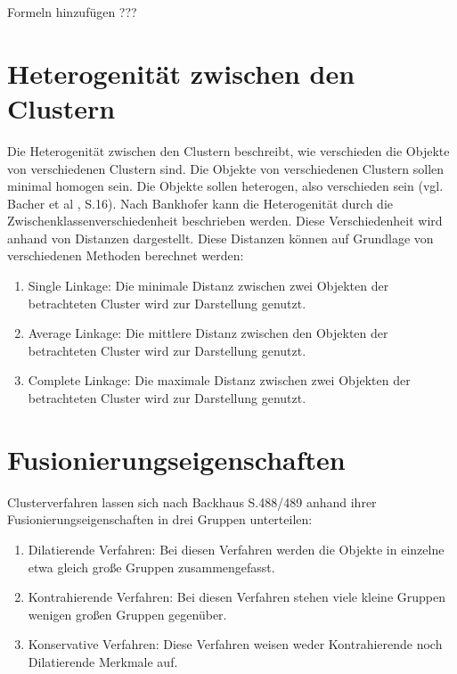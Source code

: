 Formeln hinzufügen ???
\section{Heterogenität zwischen den Clustern}
Die Heterogenität zwischen den Clustern beschreibt, wie verschieden die Objekte von verschiedenen Clustern sind. Die Objekte von verschiedenen Clustern sollen minimal homogen sein. Die Objekte sollen heterogen, also verschieden sein (vgl. Bacher et al \cite{Bacher.2010}, S.16).
Nach Bankhofer \cite{Bankhofer.2008} kann die Heterogenität durch die Zwischenklassenverschiedenheit beschrieben werden. Diese Verschiedenheit wird anhand von Distanzen dargestellt. Diese Distanzen können auf Grundlage von verschiedenen Methoden berechnet werden:
\begin{enumerate}
        \item Single Linkage: Die minimale Distanz zwischen zwei Objekten der betrachteten Cluster wird zur Darstellung genutzt.
        \item Average Linkage: Die mittlere Distanz zwischen den Objekten der betrachteten Cluster wird zur Darstellung genutzt.
        \item Complete Linkage: Die maximale Distanz zwischen zwei Objekten der betrachteten Cluster wird zur Darstellung genutzt.
\end{enumerate}

\section{Fusionierungseigenschaften}
Clusterverfahren lassen sich nach Backhaus \cite{Backhaus.2016} S.488/489 anhand ihrer Fusionierungseigenschaften in drei Gruppen unterteilen:
\begin{enumerate}
        \item Dilatierende Verfahren: Bei diesen Verfahren werden die Objekte in einzelne etwa gleich große Gruppen zusammengefasst.
        \item Kontrahierende Verfahren: Bei diesen Verfahren stehen viele kleine Gruppen wenigen großen Gruppen gegenüber.
        \item Konservative Verfahren: Diese Verfahren weisen weder Kontrahierende noch Dilatierende Merkmale auf.
\end{enumerate}
